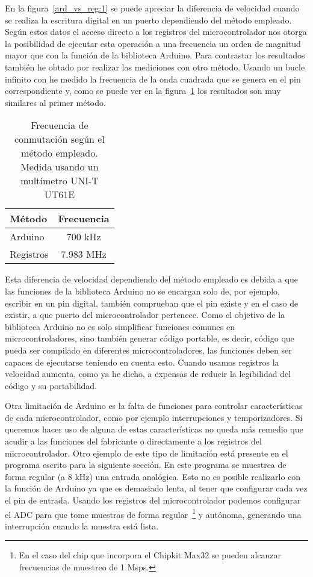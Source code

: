 En la figura~\ref{ard_vs_reg:1} se puede apreciar la diferencia de velocidad cuando se realiza la escritura digital en un puerto dependiendo del método empleado. Según estos datos el acceso directo a los registros del microcontrolador nos otorga la posibilidad de ejecutar esta operación a una frecuencia un orden de magnitud mayor que con la función  de la biblioteca Arduino. Para contrastar los resultados también he obtado por realizar las mediciones con otro método. Usando un bucle infinito con  he medido la frecuencia de la onda cuadrada que se genera en el pin correspondiente y, como se puede ver en la figura~\ref{ard_vs_reg:2} los resultados son muy similares al primer método.

\begin{table}[htb]
	\begin{center}
		\begin{tabular}{|l|c|}
			\hline
			Método		&		Frecuencia	\\
			\hline
			\hline
			Arduino		&		700 kHz			\\
			\hline
			Registros	&		7.983	MHz		\\
			\hline
		\end{tabular}
	\end{center}
	\caption{Frecuencia de conmutación según el método empleado. Medida usando un multímetro UNI-T UT61E}
	\label{ard_vs_reg:2}
\end{table}

Esta diferencia de velocidad dependiendo del método empleado es debida a que las funciones de la biblioteca Arduino no se encargan solo de, por ejemplo, escribir en un pin digital, también comprueban que el pin existe y en el caso de existir, a que puerto del microcontrolador pertenece. Como el objetivo de la biblioteca Arduino no es solo simplificar funciones comunes en microcontroladores, sino también generar código portable, es decir, código que pueda ser compilado en diferentes microcontroladores, las funciones deben ser capaces de ejecutarse teniendo en cuenta esto. Cuando usamos registros la velocidad aumenta, como ya he dicho, a expensas de reducir la legibilidad del código y su portabilidad.

Otra limitación de Arduino es la falta de funciones para controlar características de cada microcontrolador, como por ejemplo interrupciones y temporizadores. Si queremos hacer uso de alguna de estas características no queda más remedio que acudir a las funciones del fabricante o directamente a los registros del microcontrolador. Otro ejemplo de este tipo de limitación está presente en el programa escrito para la siguiente sección. En este programa se muestrea de forma regular (a 8 kHz) una entrada analógica. Esto no es posible realizarlo con la función de Arduino  ya que es demasiado lenta, al tener que configurar cada vez el pin de entrada. Usando los registros del microcontrolador podemos configurar el ADC para que tome muestras de forma regular~\footnote{En el caso del chip que incorpora el Chipkit Max32 se pueden alcanzar frecuencias de muestreo de 1 Msps.} y autónoma, generando una interrupción cuando la muestra está lista.

